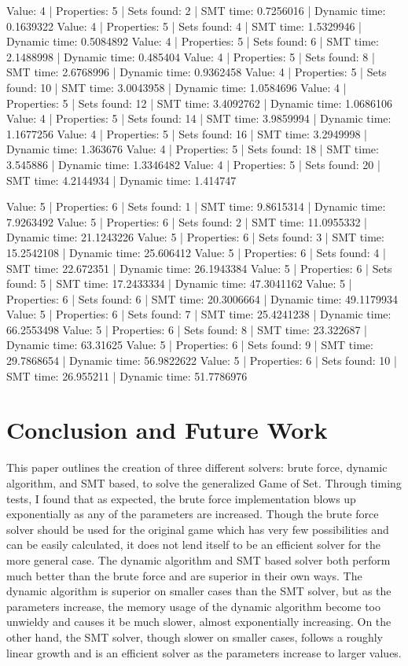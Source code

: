 \documentclass[pageno]{jpaper}
\begin{document}
Value: 4 | Properties: 5 | Sets found: 2 | SMT time: 0.7256016 | Dynamic time: 0.1639322
Value: 4 | Properties: 5 | Sets found: 4 | SMT time: 1.5329946 | Dynamic time: 0.5084892
Value: 4 | Properties: 5 | Sets found: 6 | SMT time: 2.1488998 | Dynamic time: 0.485404
Value: 4 | Properties: 5 | Sets found: 8 | SMT time: 2.6768996 | Dynamic time: 0.9362458
Value: 4 | Properties: 5 | Sets found: 10 | SMT time: 3.0043958 | Dynamic time: 1.0584696
Value: 4 | Properties: 5 | Sets found: 12 | SMT time: 3.4092762 | Dynamic time: 1.0686106
Value: 4 | Properties: 5 | Sets found: 14 | SMT time: 3.9859994 | Dynamic time: 1.1677256
Value: 4 | Properties: 5 | Sets found: 16 | SMT time: 3.2949998 | Dynamic time: 1.363676
Value: 4 | Properties: 5 | Sets found: 18 | SMT time: 3.545886 | Dynamic time: 1.3346482
Value: 4 | Properties: 5 | Sets found: 20 | SMT time: 4.2144934 | Dynamic time: 1.414747


Value: 5 | Properties: 6 | Sets found: 1 | SMT time: 9.8615314 | Dynamic time: 7.9263492
Value: 5 | Properties: 6 | Sets found: 2 | SMT time: 11.0955332 | Dynamic time: 21.1243226
Value: 5 | Properties: 6 | Sets found: 3 | SMT time: 15.2542108 | Dynamic time: 25.606412
Value: 5 | Properties: 6 | Sets found: 4 | SMT time: 22.672351 | Dynamic time: 26.1943384
Value: 5 | Properties: 6 | Sets found: 5 | SMT time: 17.2433334 | Dynamic time: 47.3041162
Value: 5 | Properties: 6 | Sets found: 6 | SMT time: 20.3006664 | Dynamic time: 49.1179934
Value: 5 | Properties: 6 | Sets found: 7 | SMT time: 25.4241238 | Dynamic time: 66.2553498
Value: 5 | Properties: 6 | Sets found: 8 | SMT time: 23.322687 | Dynamic time: 63.31625
Value: 5 | Properties: 6 | Sets found: 9 | SMT time: 29.7868654 | Dynamic time: 56.9822622
Value: 5 | Properties: 6 | Sets found: 10 | SMT time: 26.955211 | Dynamic time: 51.7786976

\section{Conclusion and Future Work}


This paper outlines the creation of three different solvers: brute force, dynamic algorithm, and SMT based, to solve the generalized Game of Set. Through timing tests, I found that as expected, the brute force implementation blows up exponentially as any of the parameters are increased. Though the brute force solver should be used for the original game which has very few possibilities and can be easily calculated, it does not lend itself to be an efficient solver for the more general case. The dynamic algorithm and SMT based solver both perform much better than the brute force and are superior in their own ways. The dynamic algorithm is superior on smaller cases than the SMT solver, but as the parameters increase, the memory usage of the dynamic algorithm become too unwieldy and causes it be much slower, almost exponentially increasing. On the other hand, the SMT solver, though slower on smaller cases, follows a roughly linear growth and is an efficient solver as the parameters increase to larger values. 
\end{document}
